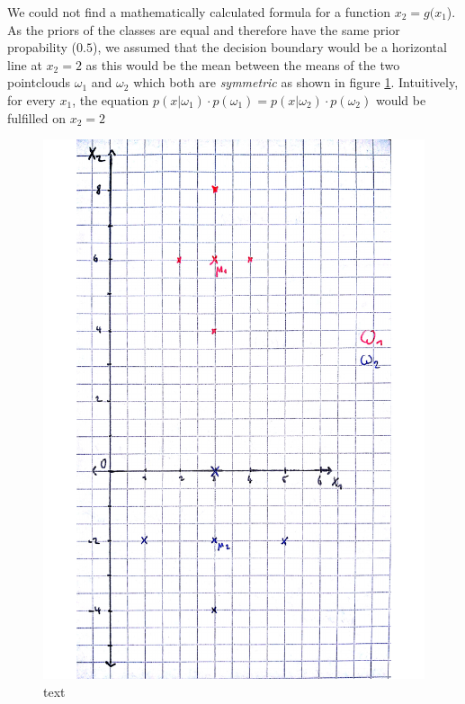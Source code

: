 We could not find a mathematically calculated formula for a function $x_2=g(x_1$).\\
As the priors of the classes are equal and therefore have the same prior propability ($0.5$), we assumed that the decision boundary would be a horizontal line at $x_2=2$ as this would be the mean between the means of the two pointclouds $\omega_1$ and $\omega_2$ which both are \textit{symmetric} as shown in figure \ref{img:pointCloud}. Intuitively, for every $x_1$, the equation $p(x|\omega_1)\cdot p(\omega_1) = p(x|\omega_2)\cdot p(\omega_2)$ would be fulfilled on $x_2=2$
\begin{figure}[b]
	\includegraphics[width=1\linewidth]{pointCloud2}
	\caption{text}
	\label{img:pointCloud}
\end{figure}

